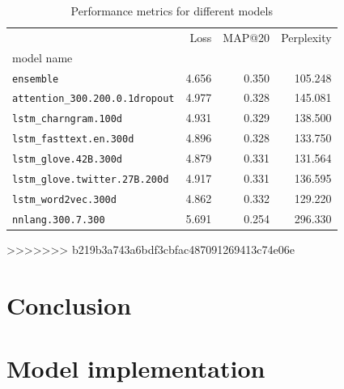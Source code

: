 \documentclass[12pt]{article}
\begin{document}
\begin{table}[h]
\centering
\begin{tabular}{lrrr}
\toprule
{}                                     & Loss  & MAP@20 & Perplexity \\
model name                             &       &        & \\
\midrule
\texttt{ensemble}                      & 4.656 & 0.350  & 105.248 \\
\texttt{attention\_300.200.0.1dropout} & 4.977 & 0.328  & 145.081 \\
\texttt{lstm\_charngram.100d}          & 4.931 & 0.329  & 138.500 \\
\texttt{lstm\_fasttext.en.300d}        & 4.896 & 0.328  & 133.750 \\
\texttt{lstm\_glove.42B.300d}          & 4.879 & 0.331  & 131.564 \\
\texttt{lstm\_glove.twitter.27B.200d}  & 4.917 & 0.331  & 136.595 \\
\texttt{lstm\_word2vec.300d}           & 4.862 & 0.332  & 129.220 \\
\texttt{nnlang.300.7.300}              & 5.691 & 0.254  & 296.330 \\
\bottomrule
\end{tabular}
\caption{Performance metrics for different models}
\label{table:performance}
\end{table}
>>>>>>> b219b3a743a6bdf3cbfac487091269413c74e06e

\section{Conclusion}





\appendix
\section{Model implementation}






\end{document}
